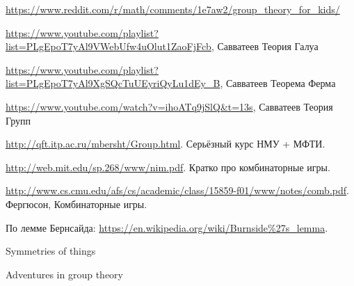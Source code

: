 \documentclass[12pt]{article} %
\begin{document}
\url{https://www.reddit.com/r/math/comments/1e7aw2/group_theory_for_kids/}



\url{https://www.youtube.com/playlist?list=PLgEpoT7yAl9VWebUfw4uOlut1ZaoFjFcb}, Савватеев Теория Галуа


\url{https://www.youtube.com/playlist?list=PLgEpoT7yAl9XgSQcTuUEyriQyLu1dEy_B}, Савватеев Теорема Ферма

\url{https://www.youtube.com/watch?v=ihoATq9jSlQ&t=13s}, Савватеев Теория Групп


\url{http://qft.itp.ac.ru/mbersht/Group.html}. Серьёзный курс НМУ + МФТИ.

\url{http://web.mit.edu/sp.268/www/nim.pdf}. Кратко про комбинаторные игры.

\url{http://www.cs.cmu.edu/afs/cs/academic/class/15859-f01/www/notes/comb.pdf}. Фергюсон, Комбинаторные игры.

По лемме Бернсайда:
\url{https://en.wikipedia.org/wiki/Burnside%27s_lemma}.


Symmetries of things

Adventures in group theory
\end{document}
